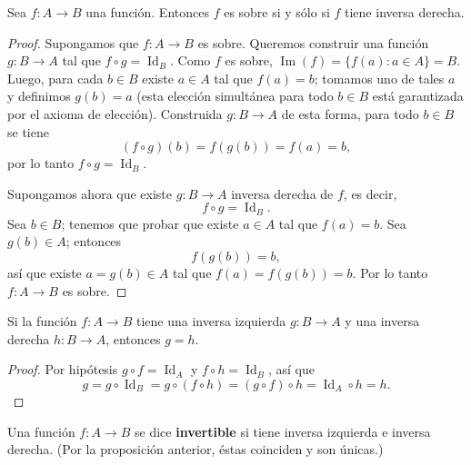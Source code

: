 \documentclass[12pt,a4paper]{book}
\begin{document}
    \begin{teorema}
        Sea $f\colon A \to B$ una función. Entonces $f$ es sobre si y sólo si $f$ tiene inversa derecha.
    \end{teorema}
    \begin{proof}
        Supongamos que $f\colon A \to B$ es sobre. Queremos construir una función $g\colon B \to A$ tal que $f \circ g = \operatorname{Id}_B$. Como $f$ es sobre, $\operatorname{Im}(f) = \{f(a) : a \in A\} = B$. Luego, para cada $b \in B$ existe $a \in A$ tal que $f(a) = b$; tomamos uno de tales $a$ y definimos $g(b) = a$ (esta elección simultánea para todo $b\in B$ está garantizada por el axioma de elección). Construida $g\colon B \to A$ de esta forma, para todo $b \in B$ se tiene
        \begin{equation*}
            (f \circ g)(b) = f(g(b)) = f(a) = b,
        \end{equation*}
        por lo tanto $f \circ g = \operatorname{Id}_B$.

        Supongamos ahora que existe $g\colon B \to A$ inversa derecha de $f$, es decir,
        \begin{equation*}
            f \circ g = \operatorname{Id}_B.
        \end{equation*}
        Sea $b \in B$; tenemos que probar que existe $a \in A$ tal que $f(a) = b$. Sea $g(b) \in A$; entonces
        \begin{equation*}
            f(g(b)) = b,
        \end{equation*}
        así que existe $a = g(b) \in A$ tal que $f(a) = f(g(b)) = b$. Por lo tanto $f\colon A \to B$ es sobre.
    \end{proof}

    \begin{proposicion}
        Si la función $f\colon A \to B$ tiene una inversa izquierda $g\colon B \to A$ y una inversa derecha $h\colon B \to A$, entonces $g = h$.
    \end{proposicion}
    \begin{proof}
        Por hipótesis $g \circ f = \operatorname{Id}_A$ y $f \circ h = \operatorname{Id}_B$, así que
        \begin{equation*}
            g = g \circ \operatorname{Id}_B = g \circ (f \circ h) = (g \circ f) \circ h = \operatorname{Id}_A \circ h = h.
        \end{equation*}
    \end{proof}

    \begin{definicion}
        Una función $f\colon A \to B$ se dice \textbf{invertible} si tiene inversa izquierda e inversa derecha. (Por la proposición anterior, éstas coinciden y son únicas.)
    \end{definicion}
\end{document}
